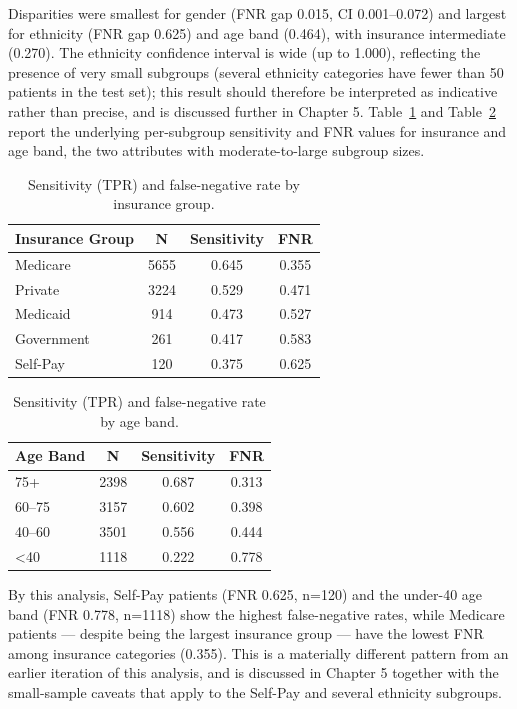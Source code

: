 \documentclass[12pt,a4paper]{report}
\begin{document}
Disparities were smallest for gender (FNR gap 0.015, CI 0.001--0.072) and largest for ethnicity (FNR gap 0.625) and age band (0.464), with insurance intermediate (0.270). The ethnicity confidence interval is wide (up to 1.000), reflecting the presence of very small subgroups (several ethnicity categories have fewer than 50 patients in the test set); this result should therefore be interpreted as indicative rather than precise, and is discussed further in Chapter 5. Table~\ref{tab:insurance-subgroups} and Table~\ref{tab:agebandsubgroups} report the underlying per-subgroup sensitivity and FNR values for insurance and age band, the two attributes with moderate-to-large subgroup sizes.


\begin{table}[H]
\centering
\caption{Sensitivity (TPR) and false-negative rate by insurance group.}
\label{tab:insurance-subgroups}
\small
\begin{tabular}{lccc}
\toprule
Insurance Group & N & Sensitivity & FNR \\
\midrule
Medicare & 5655 & 0.645 & 0.355 \\
Private & 3224 & 0.529 & 0.471 \\
Medicaid & 914 & 0.473 & 0.527 \\
Government & 261 & 0.417 & 0.583 \\
Self-Pay & 120 & 0.375 & 0.625 \\
\bottomrule
\end{tabular}
\end{table}


\begin{table}[H]
\centering
\caption{Sensitivity (TPR) and false-negative rate by age band.}
\label{tab:agebandsubgroups}
\small
\begin{tabular}{lccc}
\toprule
Age Band & N & Sensitivity & FNR \\
\midrule
75+ & 2398 & 0.687 & 0.313 \\
60--75 & 3157 & 0.602 & 0.398 \\
40--60 & 3501 & 0.556 & 0.444 \\
\textless 40 & 1118 & 0.222 & 0.778 \\
\bottomrule
\end{tabular}
\end{table}


By this analysis, Self-Pay patients (FNR 0.625, n=120) and the under-40 age band (FNR 0.778, n=1118) show the highest false-negative rates, while Medicare patients --- despite being the largest insurance group --- have the lowest FNR among insurance categories (0.355). This is a materially different pattern from an earlier iteration of this analysis, and is discussed in Chapter 5 together with the small-sample caveats that apply to the Self-Pay and several ethnicity subgroups.
\end{document}
